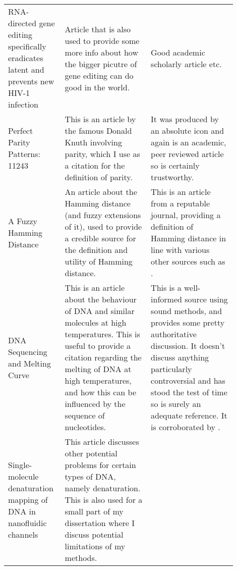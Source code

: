 \documentclass[a4paper,11pt]{article}
\begin{document}
\begin{center}
{\begin{longtable}{p{0.2\linewidth} p{0.35\linewidth} p{0.35\linewidth}}
    RNA-directed gene editing specifically eradicates latent and prevents new
    HIV-1 infection \cite{RNAHIV2014Hu} &

    Article that is also used to provide some more info about how the bigger
    picutre of gene editing can do good in the world. &

    Good academic scholarly article etc.  \\

    Perfect Parity Patterns: 11243 \cite{Parity2008Knuth} &

    This is an article by the famous Donald Knuth involving parity, which I use
    as a citation for the definition of parity. &

    It was produced by an absolute icon and again is an academic, peer reviewed
    article so is certainly trustworthy.  \\

    A Fuzzy Hamming Distance \cite{FuzzyDistance1977SGarro} &

    An article about the Hamming distance (and fuzzy extensions of it), used to
    provide a credible source for the definition and utility of Hamming
    distance. &

    This is an article from a reputable journal, providing a definition of
    Hamming distance in line with various other sources such as
    \cite{Orthogonal1981Burley}.

    \\

    DNA Sequencing and Melting Curve \cite{MeltingCurve1979Azbel} &

    This is an article about the behaviour of DNA and similar molecules at high
    temperatures. This is useful to provide a citation regarding the melting of
    DNA at high temperatures, and how this can be influenced by the sequence of
    nucleotides. &

    This is a well-informed source using sound methods, and provides some pretty
    authoritative discussion. It doesn't discuss anything particularly
    controversial and has stood the test of time so is surely an adequate
    reference. It is corroborated by \cite{MeltingPoint1980Pitkin}.

    \\

    Single-molecule denaturation mapping of DNA in nanofluidic channels
    \cite{Denaturation2010Reisner} &

    This article discusses other potential problems for certain types of DNA,
    namely denaturation. This is also used for a small part of my dissertation
    where I discuss potential limitations of my methods. &


\end{longtable}}
\end{center}
\end{document}
